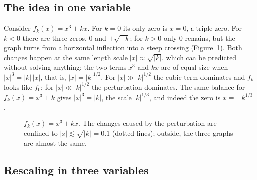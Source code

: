 \subsection{The idea in one variable}

Consider $f_k(x)=x^3+kx$. For $k=0$ its only zero is $x=0$, a triple zero.
For $k<0$ there are three zeros, $0$ and $\pm\sqrt{-k}$; for $k>0$ only $0$
remains, but the graph turns from a horizontal inflection into a steep
crossing (Figure~\ref{fig:one-variable}). Both changes happen at the same
length scale $|x|\approx\sqrt{|k|}$, which can be predicted without solving
anything: the two terms $x^3$ and $kx$ are of equal size when
$|x|^3=|k|\,|x|$, that is, $|x|=|k|^{1/2}$. For $|x|\gg|k|^{1/2}$ the cubic
term dominates and $f_k$ looks like $f_0$; for $|x|\ll|k|^{1/2}$ the
perturbation dominates. The same balance for $f_k(x)=x^3+k$ gives
$|x|^3=|k|$, the scale $|k|^{1/3}$, and indeed the zero is $x=-k^{1/3}$.

\begin{figure}[!h]
\centering
{}
\caption[Scaling in one variable]{$f_k(x)=x^3+kx$. The changes caused by the
perturbation are confined to $|x|\lesssim\sqrt{|k|}=0.1$ (dotted lines);
outside, the three graphs are almost the same.}
\label{fig:one-variable}
\end{figure}

\subsection{Rescaling in three variables}

